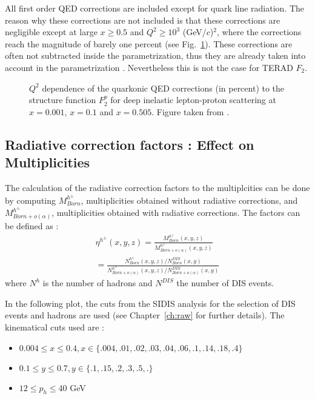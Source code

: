 All first order QED corrections are included except for quark line radiation. The reason why these corrections are not included is that these corrections are negligible except at large $x \geq 0.5$ and $Q^{2} \geq 10^3$ (GeV/$c$)$^2$, where the corrections reach the magnitude of barely one percent (see Fig.~\ref{fig:quarkline}). These corrections are often not subtracted inside the parametrization, thus they are already taken into account in the parametrization \cite{HubertF2Rad}. Nevertheless this is not the case for TERAD $F_2$.

\begin{figure}[htb]
\centerline{}
\caption{$Q^2$ dependence of the quarkonic QED corrections (in percent) to the structure function $F^p_2$ for deep inelastic
lepton-proton scattering at $x=0.001$, $x=0.1$ and $x=0.505$. Figure taken from \cite{HubertF2Rad}.}\label{fig:quarkline}
\end{figure}

\subsection{Radiative correction factors : Effect on Multiplicities}\label{sec:RCFMult}

The calculation of the radiative correction factors to the multiplcities can be done by computing
$M^{h^{\pm}}_{Born}$, multiplicities obtained without radiative corrections, and $M^{h^{\pm}}_{Born+o(\alpha)}$,
multiplicities obtained with radiative corrections. The factors can be defined as :
%
\begin{equation}
  \begin{split}
    \eta^{h^{\pm}}(x,y,z)=\frac{M^{h^{\pm}}_{Born}(x,y,z)}{M^{h^{\pm}}_{Born+o(\alpha)}(x,y,z)} \\
     = \frac{N^{h^{\pm}}_{Born}(x,y,z)/N^{DIS}_{Born}(x,y)}{N^{h^{\pm}}_{Born+o(\alpha)}(x,y,z)/N^{DIS}_{Born+o(\alpha)}(x,y)}
  \end{split}
\end{equation}
%
where $N^h$ is the number of hadrons and $N^{DIS}$ the number of DIS events.


In the following plot, the cuts from the SIDIS analysis for the selection of DIS events and hadrons are used (see Chapter~\ref{ch:raw} for further details). The kinematical cuts used are :

\begin{itemize}
\item $0.004 \leq x \leq 0.4, x \in \{.004,.01,.02,.03,.04,.06,.1,.14,.18,.4\}$
\item $0.1 \leq y \leq 0.7, y \in \{.1,.15,.2,.3,.5,.\}$
\item $12 \leq p_h \leq 40$ GeV
\end{itemize}

